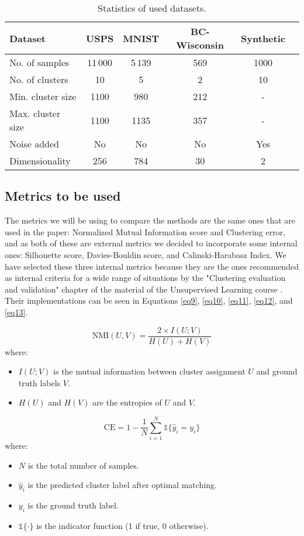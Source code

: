 \documentclass[
	10pt,
	parskip=half-,	
	paper=a4,
	english
	]{scrartcl}
\begin{document}
\begin{table}[h]
\centering
\caption{Statistics of used datasets.}
\begin{tabular}{lccccc}
\toprule
\textbf{Dataset} & \textbf{USPS} & \textbf{MNIST} & \textbf{BC-Wisconsin} & \textbf{Synthetic}\\
\midrule
No. of samples     & 11\,000 & 5\,139 & 569 & 1000 \\
No. of clusters    & 10     & 5     & 2    & 10   \\
Min. cluster size  & 1100   & 980   & 212     & - \\
Max. cluster size  & 1100   & 1135  & 357     & - \\
Noise added  & No   & No  & No     & Yes \\
Dimensionality     & 256    & 784   & 30   & 2 \\
\bottomrule
\end{tabular}
\end{table}

\subsection{Metrics to be used}

The metrics we will be using to compare the methods are the same ones that are used in the paper: Normalized Mutual Information score and Clustering error, and as both of these are external metrics we decided to incorporate some internal ones: Silhouette score, Davies-Bouldin score, and Calinski-Harabasz Index. We have selected these three internal metrics because they are the ones recommended as internal criteria for a wide range of situations by the "Clustering evaluation and validation" chapter of the material of the Unsupervised Learning course \cite{citation2}. Their implementations can be seen in Equations \ref{eq9}, \ref{eq10}, \ref{eq11}, \ref{eq12}, and \ref{eq13}.

\begin{equation}
    \text{NMI}(U, V) = \frac{2 \times I(U; V)}{H(U) + H(V)}
    \label{eq9}
\end{equation}
where:
\begin{itemize}
    \item $I(U; V)$ is the mutual information between cluster assignment $U$ and ground truth labels $V$.
    \item $H(U)$ and $H(V)$ are the entropies of $U$ and $V$.
\end{itemize}

\begin{equation}
    \text{CE} = 1 - \frac{1}{N} \sum_{i=1}^{N} \mathbb{1}\{ \hat{y}_i = y_i \}
    \label{eq10}
\end{equation}
where:
\begin{itemize}
    \item $N$ is the total number of samples.
    \item $\hat{y}_i$ is the predicted cluster label after optimal matching.
    \item $y_i$ is the ground truth label.
    \item $\mathbb{1}\{\cdot\}$ is the indicator function (1 if true, 0 otherwise).
\end{itemize}
\end{document}
